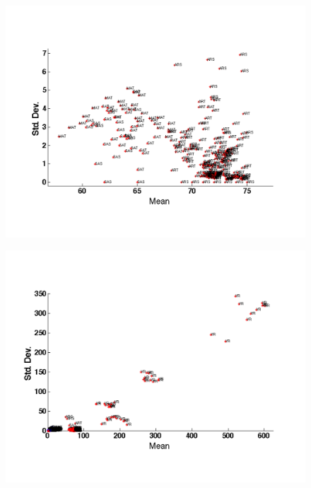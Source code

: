 \begin{figure}[t!] %
\centering
\includegraphics[width=1.0\columnwidth]{figs/temperature_streams}
\caption{}
\label{fig:tstreams}
\end{figure}


\begin{figure}[t!] %
\centering
\includegraphics[width=1.0\columnwidth]{figs/VR}
\caption{}
\label{fig:tstreams}
\end{figure}

